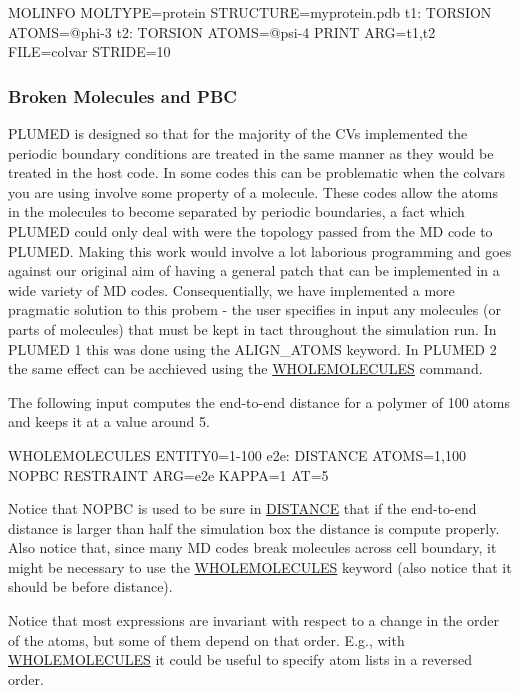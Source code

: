 \begin{DoxyVerb}MOLINFO MOLTYPE=protein STRUCTURE=myprotein.pdb
t1: TORSION ATOMS=@phi-3
t2: TORSION ATOMS=@psi-4
PRINT ARG=t1,t2 FILE=colvar STRIDE=10
\end{DoxyVerb}
\hypertarget{_group_pbc}{}\subsubsection{Broken Molecules and P\+B\+C}\label{_group_pbc}
P\+L\+U\+M\+E\+D is designed so that for the majority of the C\+Vs implemented the periodic boundary conditions are treated in the same manner as they would be treated in the host code. In some codes this can be problematic when the colvars you are using involve some property of a molecule. These codes allow the atoms in the molecules to become separated by periodic boundaries, a fact which P\+L\+U\+M\+E\+D could only deal with were the topology passed from the M\+D code to P\+L\+U\+M\+E\+D. Making this work would involve a lot laborious programming and goes against our original aim of having a general patch that can be implemented in a wide variety of M\+D codes. Consequentially, we have implemented a more pragmatic solution to this probem -\/ the user specifies in input any molecules (or parts of molecules) that must be kept in tact throughout the simulation run. In P\+L\+U\+M\+E\+D 1 this was done using the A\+L\+I\+G\+N\+\_\+\+A\+T\+O\+M\+S keyword. In P\+L\+U\+M\+E\+D 2 the same effect can be acchieved using the \hyperlink{WHOLEMOLECULES}{W\+H\+O\+L\+E\+M\+O\+L\+E\+C\+U\+L\+E\+S} command.

The following input computes the end-\/to-\/end distance for a polymer of 100 atoms and keeps it at a value around 5.

\begin{DoxyVerb}WHOLEMOLECULES ENTITY0=1-100
e2e: DISTANCE ATOMS=1,100 NOPBC
RESTRAINT ARG=e2e KAPPA=1 AT=5
\end{DoxyVerb}


Notice that N\+O\+P\+B\+C is used to be sure in \hyperlink{DISTANCE}{D\+I\+S\+T\+A\+N\+C\+E} that if the end-\/to-\/end distance is larger than half the simulation box the distance is compute properly. Also notice that, since many M\+D codes break molecules across cell boundary, it might be necessary to use the \hyperlink{WHOLEMOLECULES}{W\+H\+O\+L\+E\+M\+O\+L\+E\+C\+U\+L\+E\+S} keyword (also notice that it should be before distance).

Notice that most expressions are invariant with respect to a change in the order of the atoms, but some of them depend on that order. E.\+g., with \hyperlink{WHOLEMOLECULES}{W\+H\+O\+L\+E\+M\+O\+L\+E\+C\+U\+L\+E\+S} it could be useful to specify atom lists in a reversed order.


